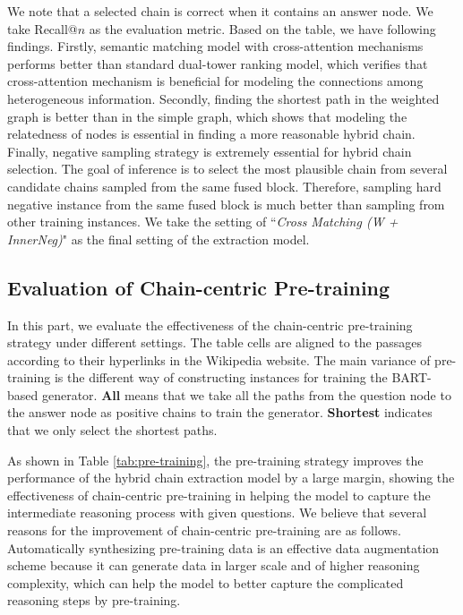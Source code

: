 \documentclass[11pt]{article}
\begin{document}
	We note that a selected chain is correct when it contains an answer node. 
	We take Recall@$n$ as the evaluation metric.  
	Based on the table, we have following findings.
	Firstly, semantic matching model with cross-attention mechanisms performs better than standard dual-tower ranking model, which verifies that cross-attention mechanism is beneficial for modeling the connections among heterogeneous information.
	Secondly, finding the shortest path in the weighted graph is better than in the simple graph, which shows that modeling the relatedness of nodes is essential in finding a more reasonable hybrid chain.
	Finally, negative sampling strategy is extremely essential for hybrid chain selection. 
	The goal of inference is to select the most plausible chain from several candidate chains sampled from the same fused block. Therefore, sampling hard negative instance from the same fused block is much better than sampling from other training instances.  We take the setting of ``\textit{Cross Matching (W + InnerNeg)}" as the final setting of the extraction model.
	\subsection{Evaluation of Chain-centric Pre-training}
	In this part, we evaluate the effectiveness of the chain-centric pre-training strategy under different settings. 
The table cells are aligned to the passages according to their hyperlinks in the Wikipedia website. 
	The main variance of pre-training is the different way of constructing instances for training the BART-based generator. \textbf{All} means that we take all the paths from the question node to the answer node as positive chains to train the generator. \textbf{Shortest} indicates that we only select the shortest paths. 
	
	As shown in Table \ref{tab:pre-training}, the pre-training strategy improves the performance of the hybrid chain extraction model by a large margin, showing the effectiveness of chain-centric pre-training in helping the model to capture the intermediate reasoning process with given questions. 
We believe that several reasons for the improvement of chain-centric pre-training are as follows.
Automatically synthesizing pre-training data is an effective data augmentation scheme because it can generate data in larger scale and of higher reasoning complexity, which can help the model to better capture the complicated reasoning steps by pre-training. 
\end{document}
